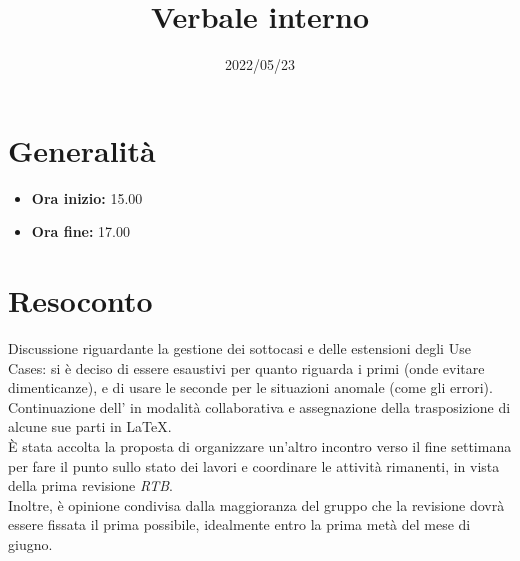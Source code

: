 \documentclass{classes/base}
\title{Verbale interno}
\date{2022/05/23}
\author{\marcov}
\renewcommand{\maketitle}{
    
}
\begin{document}
    \maketitle

    \section*{Generalità}
    \begin{itemize}
        \item \textbf{Ora inizio:} 15.00
        \item \textbf{Ora fine:} 17.00
    \end{itemize}

    \section*{Resoconto}
    Discussione riguardante la gestione dei sottocasi e delle estensioni degli Use Cases: si è deciso di essere esaustivi per quanto riguarda i primi (onde evitare dimenticanze), e di usare le seconde per le situazioni anomale (come gli errori). \\
    Continuazione dell'\AdR{} in modalità collaborativa e assegnazione della trasposizione di alcune sue parti in \LaTeX.\\
    È stata accolta la proposta di organizzare un'altro incontro verso il fine settimana per fare il punto sullo stato dei lavori e coordinare le attività rimanenti, in vista della prima revisione \textit{RTB}.\\
    Inoltre, è opinione condivisa dalla maggioranza del gruppo che la revisione dovrà essere fissata il prima possibile, idealmente entro la prima metà del mese di giugno.
\end{document}
